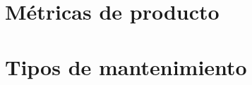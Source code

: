 \localtableofcontents

\section{Métricas de producto}\label{sec:tema-6.1---metricas-de-producto}



\section{Tipos de mantenimiento}\label{sec:tipos-de-mantenimiento}


